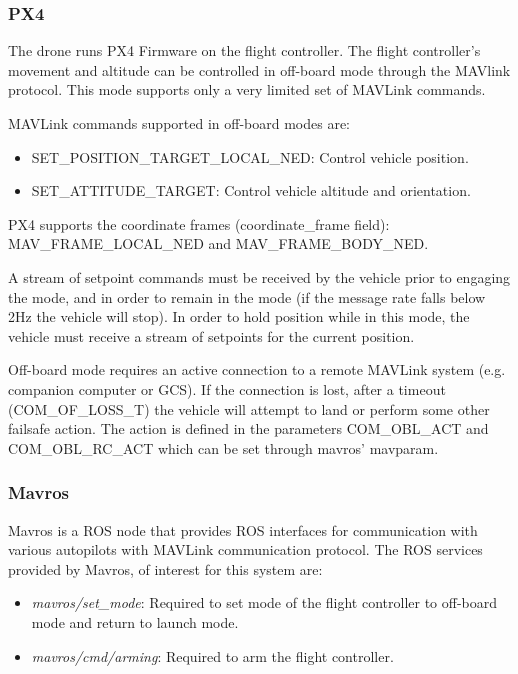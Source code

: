 \subsubsection{PX4}
The drone runs PX4 Firmware on the flight controller. The flight controller's movement and altitude can be controlled in off-board mode through the MAVlink protocol. This mode supports only a very limited set of MAVLink commands.

MAVLink commands supported in off-board modes are:
\begin{itemize}
	\item SET\_POSITION\_TARGET\_LOCAL\_NED: Control vehicle position.
	\item SET\_ATTITUDE\_TARGET: Control vehicle altitude and orientation.
\end{itemize}

PX4 supports the coordinate frames (coordinate\_frame field): MAV\_FRAME\_LOCAL\_NED and MAV\_FRAME\_BODY\_NED.

A stream of setpoint commands must be received by the vehicle prior to engaging the mode, and in order to remain in the mode (if the message rate falls below 2Hz the vehicle will stop). In order to hold position while in this mode, the vehicle must receive a stream of setpoints for the current position.

Off-board mode requires an active connection to a remote MAVLink system (e.g. companion computer or GCS). If the connection is lost, after a timeout (COM\_OF\_LOSS\_T) the vehicle will attempt to land or perform some other failsafe action. The action is defined in the parameters COM\_OBL\_ACT and COM\_OBL\_RC\_ACT which can be set through mavros' mavparam.

\subsubsection{Mavros}

Mavros is a ROS node that provides ROS interfaces for communication with various autopilots with MAVLink communication protocol.
The ROS services provided by Mavros,  of interest for this system are:
\begin{itemize}
	\item \textit{mavros/set\_mode}: Required to set mode of the flight controller to off-board mode and return to launch mode.
	\item \textit{mavros/cmd/arming}: Required to arm the flight controller.
\end{itemize}

